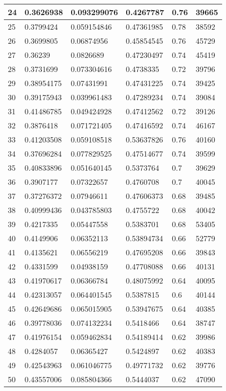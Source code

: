 \begin{longtable}{|l|l|l|l|l|l|}
24 & 0.3626938 & 0.093299076 & 0.4267787 & 0.76 & 39665 \\ \hline 
25 & 0.3799424 & 0.059154846 & 0.47361985 & 0.78 & 38592 \\ \hline 
26 & 0.3699805 & 0.06874956 & 0.45854545 & 0.76 & 45729 \\ \hline 
27 & 0.36239 & 0.0826689 & 0.47230497 & 0.74 & 45419 \\ \hline 
28 & 0.3731699 & 0.073304616 & 0.4738335 & 0.72 & 39796 \\ \hline 
29 & 0.38954175 & 0.07431991 & 0.47431225 & 0.74 & 39425 \\ \hline 
30 & 0.39175943 & 0.039961483 & 0.47289234 & 0.74 & 39084 \\ \hline 
31 & 0.41486785 & 0.049424928 & 0.47412562 & 0.72 & 39126 \\ \hline 
32 & 0.3876418 & 0.071721405 & 0.47416592 & 0.74 & 46167 \\ \hline 
33 & 0.41203508 & 0.059108518 & 0.53637826 & 0.76 & 40160 \\ \hline 
34 & 0.37696284 & 0.077829525 & 0.47514677 & 0.74 & 39599 \\ \hline 
35 & 0.40833896 & 0.051640145 & 0.5373764 & 0.7 & 39629 \\ \hline 
36 & 0.3907177 & 0.07322657 & 0.4760708 & 0.7 & 40045 \\ \hline 
37 & 0.37276372 & 0.07946611 & 0.47606373 & 0.68 & 39485 \\ \hline 
38 & 0.40999436 & 0.043785803 & 0.4755722 & 0.68 & 40042 \\ \hline 
39 & 0.4217335 & 0.05447558 & 0.5383701 & 0.68 & 53405 \\ \hline 
40 & 0.4149906 & 0.06352113 & 0.53894734 & 0.66 & 52779 \\ \hline 
41 & 0.4135621 & 0.06556219 & 0.47695208 & 0.66 & 39843 \\ \hline 
42 & 0.4331599 & 0.04938159 & 0.47708088 & 0.66 & 40131 \\ \hline 
43 & 0.41970617 & 0.06366784 & 0.48075992 & 0.64 & 40095 \\ \hline 
44 & 0.42313057 & 0.064401545 & 0.5387815 & 0.6 & 40144 \\ \hline 
45 & 0.42649686 & 0.065015905 & 0.53947675 & 0.64 & 40385 \\ \hline 
46 & 0.39778036 & 0.074132234 & 0.5418466 & 0.64 & 38747 \\ \hline 
47 & 0.41976154 & 0.059462834 & 0.54189414 & 0.62 & 39986 \\ \hline 
48 & 0.4284057 & 0.06365427 & 0.5424897 & 0.62 & 40383 \\ \hline 
49 & 0.42543963 & 0.061046775 & 0.49771732 & 0.62 & 39776 \\ \hline 
50 & 0.43557006 & 0.085804366 & 0.5444037 & 0.62 & 47090 \\ \hline 
\end{longtable}